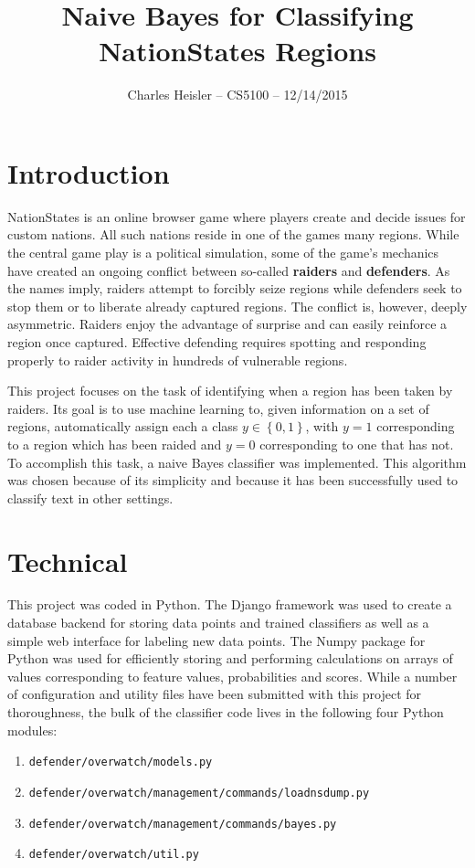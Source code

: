 \documentclass[12pt]{article}
\title{Naive Bayes for Classifying NationStates Regions}
\author{Charles Heisler -- CS5100 -- 12/14/2015}
\date{}
\begin{document}
\maketitle

\section{Introduction}
NationStates is an online browser game where players create and decide issues for custom nations. All such nations reside in one of the games many regions. While the central game play is a political simulation, some of the game's mechanics have created an ongoing conflict between so-called \textbf{raiders} and \textbf{defenders}. As the names imply, raiders attempt to forcibly seize regions while defenders seek to stop them or to liberate already captured regions. The conflict is, however, deeply asymmetric. Raiders enjoy the advantage of surprise and can easily reinforce a region once captured. Effective defending requires spotting and responding properly to raider activity in hundreds of vulnerable regions.

This project focuses on the task of identifying when a region has been taken by raiders. Its goal is to use machine learning to, given information on a set of regions, automatically assign each a class $y \in \left\{0,1\right\}$, with $y=1$ corresponding to a region which has been raided and $y=0$ corresponding to one that has not. To accomplish this task, a naive Bayes classifier was implemented. This algorithm was chosen because of its simplicity and because it has been successfully used to classify text in other settings.

\section{Technical}
This project was coded in Python. The Django framework was used to create a database backend for storing data points and trained classifiers as well as a simple web interface for labeling new data points. The Numpy package for Python was used for efficiently storing and performing calculations on arrays of values corresponding to feature values, probabilities and scores. While a number of configuration and utility files have been submitted with this project for thoroughness, the bulk of the classifier code lives in the following four Python modules:

\begin{enumerate}
\item \texttt{defender/overwatch/models.py}
\item \texttt{defender/overwatch/management/commands/loadnsdump.py}
\item \texttt{defender/overwatch/management/commands/bayes.py}
\item \texttt{defender/overwatch/util.py}
\end{enumerate}
\end{document}
